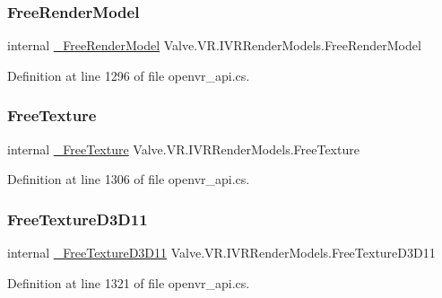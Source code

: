 \subsubsection{\texorpdfstring{FreeRenderModel}{FreeRenderModel}}
{\footnotesize\ttfamily internal \mbox{\hyperlink{struct_valve_1_1_v_r_1_1_i_v_r_render_models_a4fa1104771d8555a178db0ff8c817849}{\+\_\+\+Free\+Render\+Model}} Valve.\+V\+R.\+I\+V\+R\+Render\+Models.\+Free\+Render\+Model}



Definition at line 1296 of file openvr\+\_\+api.\+cs.

\mbox{\label{struct_valve_1_1_v_r_1_1_i_v_r_render_models_a0b8315d6a5b3731b76a76a791769e989}} 
\subsubsection{\texorpdfstring{FreeTexture}{FreeTexture}}
{\footnotesize\ttfamily internal \mbox{\hyperlink{struct_valve_1_1_v_r_1_1_i_v_r_render_models_ac4a47c1b699bbc29965d6ebd54895fe0}{\+\_\+\+Free\+Texture}} Valve.\+V\+R.\+I\+V\+R\+Render\+Models.\+Free\+Texture}



Definition at line 1306 of file openvr\+\_\+api.\+cs.

\mbox{\label{struct_valve_1_1_v_r_1_1_i_v_r_render_models_a447587837a0cfe26138e71f7e55ff016}} 
\subsubsection{\texorpdfstring{FreeTextureD3D11}{FreeTextureD3D11}}
{\footnotesize\ttfamily internal \mbox{\hyperlink{struct_valve_1_1_v_r_1_1_i_v_r_render_models_a64addc40cba89770ceaf1e258ab4d793}{\+\_\+\+Free\+Texture\+D3\+D11}} Valve.\+V\+R.\+I\+V\+R\+Render\+Models.\+Free\+Texture\+D3\+D11}



Definition at line 1321 of file openvr\+\_\+api.\+cs.

